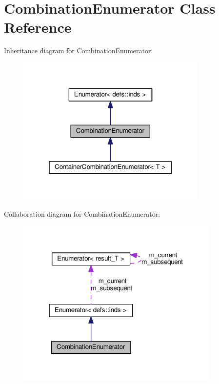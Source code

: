 \hypertarget{classCombinationEnumerator}{}\section{Combination\+Enumerator Class Reference}
\label{classCombinationEnumerator}


Inheritance diagram for Combination\+Enumerator\+:\nopagebreak
\begin{figure}[H]
\begin{center}
\leavevmode
\includegraphics[width=268pt]{classCombinationEnumerator__inherit__graph}
\end{center}
\end{figure}


Collaboration diagram for Combination\+Enumerator\+:\nopagebreak
\begin{figure}[H]
\begin{center}
\leavevmode
\includegraphics[width=286pt]{classCombinationEnumerator__coll__graph}
\end{center}
\end{figure}
